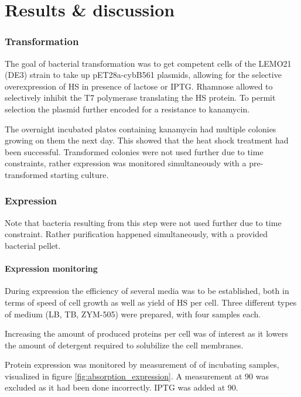 \twocolumn

\part{Results \& discussion}

\section{Transformation}

The goal of bacterial transformation was to get competent \ecoli{} cells of the
LEMO21 (DE3) strain to take up pET28a-cybB561 plasmids, allowing for the
selective overexpression of HS in presence of lactose or IPTG. Rhamnose allowed
to selectively inhibit the T7 polymerase translating the HS protein.
\cite{memstar} To permit selection the plasmid further encoded for a resistance
to kanamycin.

The overnight incubated plates containing kanamycin had multiple colonies
growing on them the next day. This showed that the heat shock treatment had
been successful. Transformed colonies were not used further due to time
constraints, rather expression was monitored simultaneously with
a pre-transformed starting culture.

\section{Expression}

Note that bacteria resulting from this step were not used further due to time
constraint. Rather purification happened simultaneously, with a provided
bacterial pellet.

\subsection{Expression monitoring}

During expression the efficiency of several media was to be established, both
in terms of speed of cell growth as well as yield of HS per cell. Three
different types of medium (LB, TB, ZYM-505) were prepared, with four samples
each.

Increasing the amount of produced proteins per cell was of interest as it
lowers the amount of detergent required to solubilize the cell membranes.

Protein expression was monitored by measurement of \odbact{} of incubating
samples, visualized in figure \ref{fig:absorption_expression}. A measurement at
\SI{90}{\min} was excluded as it had been done incorrectly. IPTG was added at
\SI{90}{\min}.


